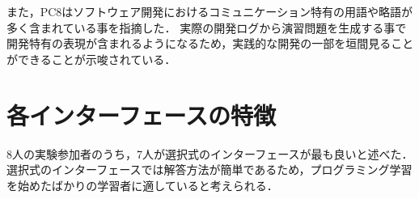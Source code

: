 

また，PC8はソフトウェア開発におけるコミュニケーション特有の用語や略語が多く含まれている事を指摘した．
実際の開発ログから演習問題を生成する事で開発特有の表現が含まれるようになるため，実践的な開発の一部を垣間見ることができることが示唆されている．












\section*{各インターフェースの特徴}

8人の実験参加者のうち，7人が選択式のインターフェースが最も良いと述べた．
選択式のインターフェースでは解答方法が簡単であるため，プログラミング学習を始めたばかりの学習者に適していると考えられる．




